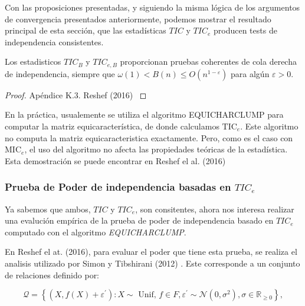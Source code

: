 \begin{defn}
            Con las proposiciones presentadas, y siguiendo la misma l\'ogica de los argumentos de convergencia presentados anteriormente, podemos mostrar el resultado principal de esta secci\'on, que las estad\'isticas $TIC$ y $TIC_e$ producen tests de independencia consistentes.
    
            \begin{thm}
                Los estadisticos $T I C_B$ y $T I C_{e, B}$ proporcionan pruebas coherentes de cola derecha de independencia, siempre que $\omega(1)<B(n) \leq O\left(n^{1-\varepsilon}\right)$ para alg\'un $\varepsilon>0$.
            \end{thm}
            \begin{proof}
                Ap\'endice K.3. Reshef (2016) \cite{Reshef2016}
            \end{proof}
    
            En la pr\'actica, usualemente se utiliza el algoritmo  EQUICHARCLUMP \cite[Secci\'on 4.3]{Reshef2016} para computar la matriz equicaracter\'istica, de donde calculamos $\mathrm{TIC}_e$. Este algoritmo no computa la matriz equicaracteristica exactamente. Pero, como es el caso con $\mathrm{MIC}_e$, el uso del algoritmo no afecta las propiedades te\'oricas de la estad\'istica. Esta demostraci\'on se puede encontrar en Reshef el al. (2016) \cite[Ap\'endice H]{Reshef2016}
        \end{defn}
    
        \subsubsection[poder de independencia basado en TICe]{Prueba de Poder de independencia basadas en $TIC_e$}
    
        Ya sabemos que ambos, $TIC$ y $TIC_e$, son consitentes, ahora nos interesa realizar una evaluci\'on emp\'irica de la prueba de poder de independencia basado en $TIC_e$ computado con el algoritmo \textit{EQUICHARCLUMP}.
    
        En Reshef el at. (2016)\cite{Reshef2016}, para evaluar el poder que tiene esta prueba, se realiza el analisis utilizado por Simon y Tibshirani (2012) \cite{SimonTibshirani}. Este corresponde a un conjunto de relaciones definido por:
    
        $$
        \mathcal{Q}=\left\{\left(X, f(X)+\varepsilon^{\prime}\right): X \sim \text { Unif, } f \in F, \varepsilon^{\prime} \sim \mathcal{N}\left(0, \sigma^2\right), \sigma \in \mathbb{R}_{\geq 0}\right\},
        $$
        
